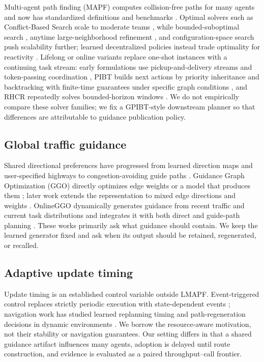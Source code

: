 \documentclass[sigconf,anonymous,review]{acmart}
\begin{document}
Multi-agent path finding (MAPF) computes collision-free paths for many agents
and now has standardized definitions and benchmarks \cite{stern2019benchmarks}.
Optimal solvers such as Conflict-Based Search scale to moderate teams
\cite{sharon2015cbs}, while bounded-suboptimal search \cite{li2021eecbs},
anytime large-neighborhood refinement \cite{li2021mapflns}, and
configuration-space search \cite{okumura2023lacam} push scalability further;
learned decentralized policies instead trade optimality for reactivity
\cite{sartoretti2019primal}. Lifelong or online variants replace one-shot
instances with a continuing task stream: early formulations use
pickup-and-delivery streams and token-passing coordination \cite{ma2017lifelong},
PIBT builds next actions by priority inheritance and backtracking with
finite-time guarantees under specific graph conditions \cite{ijcai2019p76}, and
RHCR repeatedly solves bounded-horizon windows \cite{li2021rhcr}. We do not
empirically compare these solver families; we fix a GPIBT-style downstream
planner so that differences are attributable to guidance publication policy.

\subsection{Global traffic guidance}

Shared directional preferences have progressed from learned direction maps
and user-specified highways \cite{jansen2008direction,cohen2015highways} to
congestion-avoiding guide paths \cite{chen2024traffic}. Guidance Graph
Optimization (GGO) directly optimizes edge weights or a model that produces
them \cite{ijcai2024p0035}; later work extends the representation to mixed edge
directions and weights \cite{zhang2026mixed}. OnlineGGO dynamically generates
guidance from recent traffic and current task distributions and integrates it
with both direct and guide-path planning \cite{zang2025online}. These works
primarily ask what guidance should contain. We keep the learned generator
fixed and ask when its output should be retained, regenerated, or recalled.

\subsection{Adaptive update timing}

Update timing is an established control variable outside LMAPF. Event-triggered
control replaces strictly periodic execution with state-dependent events
\cite{tabuada2007event}; navigation work has studied learned replanning timing
and path-regeneration decisions in dynamic environments
\cite{honda2024when,han2018path}. We borrow the resource-aware motivation, not
their stability or navigation guarantees. Our setting differs in that a shared
guidance artifact influences many agents, adoption is delayed until route
construction, and evidence is evaluated as a paired throughput--call frontier.
\end{document}
